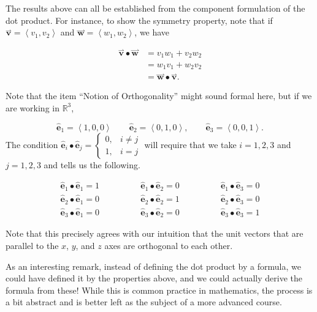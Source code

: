 \documentclass{ximera}
\begin{document}
 The results above can all be established from the component formulation of the dot product.  For instance, to show the symmetry property, note that if $\overset{\boldsymbol{\rightharpoonup}}{\mathbf{v}} = \left< v_1,v_2 \right>$ and $\overset{\boldsymbol{\rightharpoonup}}{\mathbf{w}} = \left< w_1,w_2 \right>$, we have
 
 \begin{align*}
 \overset{\boldsymbol{\rightharpoonup}}{\mathbf{v}} \bullet \overset{\boldsymbol{\rightharpoonup}}{\mathbf{w}} &= v_1w_1+v_2w_2\\
 &= w_1v_1+w_2v_2 \\
 &= \overset{\boldsymbol{\rightharpoonup}}{\mathbf{w}} \bullet \overset{\boldsymbol{\rightharpoonup}}{\mathbf{v}}.
 \end{align*}
 
Note that the item ``Notion of Orthogonality'' might sound formal here, but if we are working in $\mathbb{R}^3$, 


\[
\mathbf{\hat{e}}_1 = \left< 1,0,0 \right> \qquad \mathbf{\hat{e}}_2 = \left< 0,1,0 \right>, \qquad \mathbf{\hat{e}}_3 = \left< 0,0,1 \right>.
\]
The condition $\mathbf{\hat{e}}_i \bullet \mathbf{\hat{e}}_j = \left\{ \begin{array}{ll} 0, & i \neq j \\ 1, & i=j \end{array} \right.$ will require that we take $i=1,2,3$ and $j=1,2,3$ and tells us the following. 

\[
\begin{array}{lll}
\mathbf{\hat{e}}_1 \bullet \mathbf{\hat{e}}_1 = 1 \qquad \qquad & \mathbf{\hat{e}}_1 \bullet \mathbf{\hat{e}}_2 = 0 \qquad \qquad & \mathbf{\hat{e}}_1 \bullet \mathbf{\hat{e}}_3 = 0 \\
\mathbf{\hat{e}}_2 \bullet \mathbf{\hat{e}}_1 = 0 & \mathbf{\hat{e}}_2 \bullet \mathbf{\hat{e}}_2 = 1 & \mathbf{\hat{e}}_2 \bullet \mathbf{\hat{e}}_3 = 0 \\
\mathbf{\hat{e}}_3 \bullet \mathbf{\hat{e}}_1 = 0 & \mathbf{\hat{e}}_3 \bullet \mathbf{\hat{e}}_2 = 0 & \mathbf{\hat{e}}_3 \bullet \mathbf{\hat{e}}_3 = 1
\end{array}
\]

Note that this precisely agrees with our intuition that the unit vectors that are parallel to the $x$, $y$, and $z$ axes are orthogonal to each other.

As an interesting remark, instead of defining the dot product by a formula, we could have
defined it by the properties above, and we could actually derive the formula from these!  While this is common practice in
mathematics, the process is a bit abstract and is better left as the subject of a more advanced course.
\end{document}
